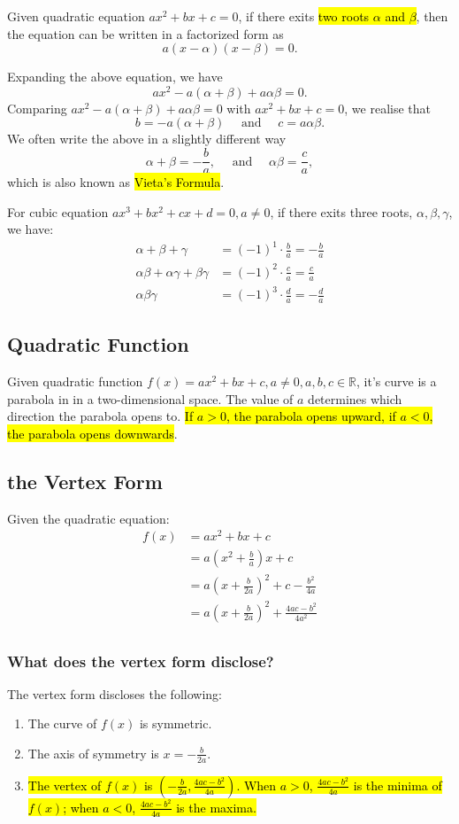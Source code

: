 \documentclass[11pt, oneside]{article}   	%
\begin{document}
Given quadratic equation $ax^2+bx+c=0$, if there exits \hl{two roots $\alpha$ and $\beta$}, then the equation can be written in a factorized form as 
\[a(x-\alpha)(x-\beta) = 0.\] 

Expanding the above equation, we have 
\[ax^2-a(\alpha+\beta)+a\alpha\beta=0.\]
Comparing $ax^2-a(\alpha+\beta)+a\alpha\beta=0$ with $ax^2+bx+c=0$, we realise that 
\[b=-a(\alpha+\beta)\quad  \text{ and } \quad c=a\alpha\beta.\] 
We often write the above in a slightly different way 
\[\alpha+\beta=-\frac{b}{a}, \quad  \text{ and } \quad \alpha\beta=\frac{c}{a},\] 
which is also known as \hl{Vieta's Formula}. 

For cubic equation $ax^3+bx^2+cx+d=0, a \ne 0$, if there exits three roots, $\alpha, \beta, \gamma$, we have: 
\begin{align*}
\alpha + \beta + \gamma &= (-1)^1\cdot\frac{b}{a}=-\frac{b}{a}\\
\alpha\beta+\alpha\gamma+\beta\gamma &= (-1)^2\cdot\frac{c}{a}=\frac{c}{a}\\
\alpha\beta\gamma &= (-1)^3\cdot\frac{d}{a} = -\frac{d}{a}
\end{align*}


\subsection{Quadratic Function} 
Given quadratic function $f(x)=ax^2+bx+c, a\ne 0, a, b, c \in\mathbb{R}$, it's curve is a parabola in in a two-dimensional space. The value of $a$ determines which direction the parabola opens to. \hl{If $a>0$, the parabola opens upward, if $a<0$, the parabola opens downwards}. 

\subsection{the Vertex Form} 

Given the quadratic equation: 
\begin{align*}
f(x) &=ax^2+bx+c\\
& =a\left(x^2+\frac{b}{a}\right)x+c\\
& =a\left(x+\frac{b}{2a}\right)^2+c-\frac{b^2}{4a}\\
& =a\left(x+\frac{b}{2a}\right)^2+\frac{4ac-b^2}{4a^2}\\
\end{align*}

\subsubsection{What does the vertex form disclose? }
The vertex form discloses the following:
\begin{enumerate}
\item The curve of $f(x)$ is symmetric.

\item The axis of symmetry is $x=-\frac{b}{2a}$. 

\item \hl{The vertex of $f(x)$ is $(-\frac{b}{2a}, \frac{4ac-b^2}{4a})$. When $a>0$, $\frac{4ac-b^2}{4a}$ is the minima of $f
(x)$; when $a<0$, $\frac{4ac-b^2}{4a}$ is the maxima. }

\end{enumerate} 
\end{document}
